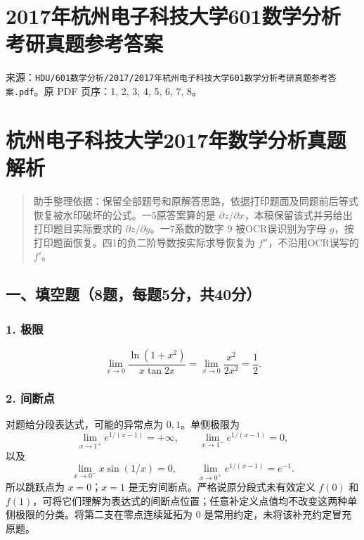 \documentclass[11pt,fontset=fandol]{ctexart}
\begin{document}
\section{2017年杭州电子科技大学601数学分析考研真题参考答案}\label{ux5e74ux676dux5ddeux7535ux5b50ux79d1ux6280ux5927ux5b66601ux6570ux5b66ux5206ux6790ux8003ux7814ux771fux9898ux53c2ux8003ux7b54ux6848}

来源：\texttt{HDU/601数学分析/2017/2017年杭州电子科技大学601数学分析考研真题参考答案.pdf}。原
PDF 页序：1, 2, 3, 4, 5, 6, 7, 8。

\section{杭州电子科技大学2017年数学分析真题解析}\label{ux676dux5ddeux7535ux5b50ux79d1ux6280ux5927ux5b662017ux5e74ux6570ux5b66ux5206ux6790ux771fux9898ux89e3ux6790}

\begin{quote}
助手整理依据：保留全部题号和原解答思路，依据打印题面及同题前后等式恢复被水印破坏的公式。一5原答案算的是
\(\partial z/\partial x\)，本稿保留该式并另给出打印题目实际要求的
\(\partial z/\partial y\)。一7系数的数字 \(9\) 被OCR误识别为字母
\(g\)，按打印题面恢复。四1的负二阶导数按实际求导恢复为
\(f''\)，不沿用OCR误写的 \(f'\)。
\end{quote}

\subsection{一、填空题（8题，每题5分，共40分）}\label{ux4e00ux586bux7a7aux98988ux9898ux6bcfux98985ux5206ux517140ux5206}

\subsubsection{1. 极限}\label{ux6781ux9650}

\[
\lim_{x\to0}\frac{\ln(1+x^2)}{x\tan2x}
=\lim_{x\to0}\frac{x^2}{2x^2}=\frac12.
\]

\subsubsection{2. 间断点}\label{ux95f4ux65adux70b9}

对题给分段表达式，可能的异常点为 \(0,1\)。单侧极限为 \[
\lim_{x\to1^+}e^{1/(x-1)}=+\infty,\qquad
\lim_{x\to1^-}e^{1/(x-1)}=0,
\] 以及 \[
\lim_{x\to0^-}x\sin(1/x)=0,\qquad
\lim_{x\to0^+}e^{1/(x-1)}=e^{-1}.
\] 所以跳跃点为 \(x=0\)；\(x=1\) 是无穷间断点。严格说原分段式未有效定义
\(f(0)\) 和
\(f(1)\)，可将它们理解为表达式的间断点位置；任意补定义点值均不改变这两种单侧极限的分类。将第二支在零点连续延拓为
\(0\) 是常用约定，未将该补充约定冒充原题。
\end{document}
